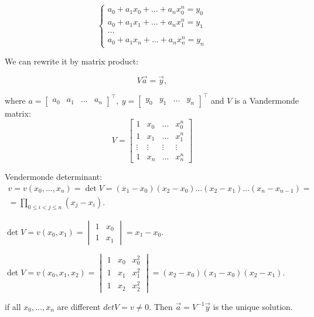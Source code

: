 \[
    \left\{
        \begin{array}{c}
            a_0 + a_1 x_0 + \ldots + a_n x_0^n = y_0 \\
            a_0 + a_1 x_1 + \ldots + a_n x_1^n = y_1 \\
            \ldots \\
            a_0 + a_1 x_n + \ldots + a_n x_n^n = y_n
        \end{array}
    \right.  
\]
\vspace*{0.5cm}

We can rewrite it by matrix product:

\[
    V\vec{a} = \vec{y},
\]

where $a = \begin{bmatrix}
    a_0 & a_1 & \ldots & a_n
\end{bmatrix}^\intercal, \ y = \begin{bmatrix}
    y_0 & y_1 & \ldots & y_n
\end{bmatrix}^\intercal$ and $V$ is a Vandermonde matrix:
\[
    V = \begin{bmatrix}
        1 & x_0 & \ldots & x_0^n \\
        1 & x_1 & \ldots & x_1^n \\
        \vdots & \vdots & \vdots & \vdots\\
        1 & x_n & \ldots & x_n^n
    \end{bmatrix}  
\]
\begin{note}{}{}
    Vendermonde determinant:
    \begin{gather*}
        v = v(x_0, \ldots, x_n) = \det V = (x_1 - x_0)(x_2-x_0)\ldots(x_2-x_1)\ldots (x_n - x_{n-1}) =   \\
        = \prod\limits_{0 \leq i < j \leq n} (x_j - x_i).
    \end{gather*}
\end{note}
\Ex $\det V = v(x_0, x_1) = \begin{vmatrix}
    1 & x_0\\
    1 & x_1
\end{vmatrix} = x_1 - x_0$.

\Ex $\det V = v(x_0, x_1, x_2) = \begin{vmatrix}
    1 & x_0 & x_0^2\\
    1 & x_1 & x_1^2\\
    1 & x_2 & x_2^2
\end{vmatrix} = (x_2 - x_0)(x_1 - x_0)(x_2 - x_1)$.

\cons if all $x_0, \ldots, x_n$ are different $det V = v \neq 0$. Then $\vec{a} = V^{-1}\vec{y}$ is the unique solution.

